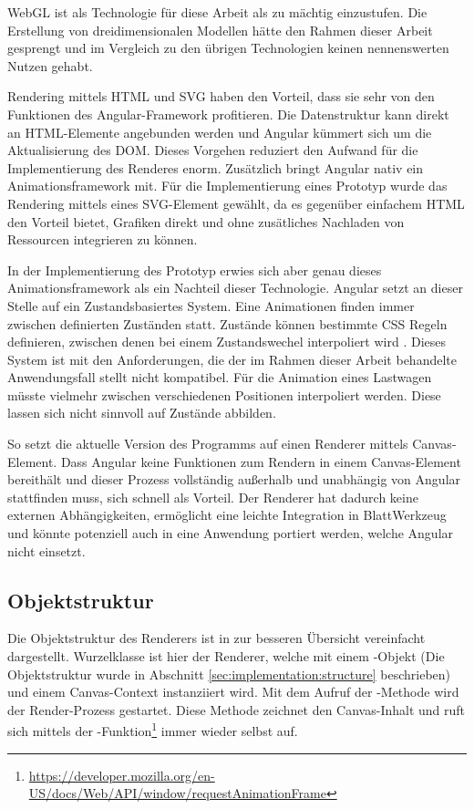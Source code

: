 WebGL ist als Technologie für diese Arbeit als zu mächtig einzustufen. Die Erstellung von dreidimensionalen Modellen hätte den Rahmen dieser Arbeit gesprengt und im Vergleich zu den übrigen Technologien keinen nennenswerten Nutzen gehabt.

Rendering mittels HTML und SVG haben den Vorteil, dass sie sehr von den Funktionen des Angular-Framework profitieren. Die Datenstruktur kann direkt an HTML-Elemente angebunden werden und Angular kümmert sich um die Aktualisierung des DOM. Dieses Vorgehen reduziert den Aufwand für die Implementierung des Renderes enorm. Zusätzlich bringt Angular nativ ein Animationsframework mit. Für die Implementierung eines Prototyp wurde das Rendering mittels eines SVG-Element gewählt, da es gegenüber einfachem HTML den Vorteil bietet, Grafiken direkt und ohne zusätliches Nachladen von Ressourcen integrieren zu können.

In der Implementierung des Prototyp erwies sich aber genau dieses Animationsframework als ein Nachteil dieser Technologie. Angular setzt an dieser Stelle auf ein Zustandsbasiertes System. Eine Animationen finden immer zwischen definierten Zuständen statt. Zustände können bestimmte CSS Regeln definieren, zwischen denen bei einem Zustandswechel interpoliert wird \cite{angular-animations}. Dieses System ist mit den Anforderungen, die der im Rahmen dieser Arbeit behandelte Anwendungsfall stellt nicht kompatibel. Für die Animation eines Lastwagen müsste vielmehr zwischen verschiedenen Positionen interpoliert werden. Diese lassen sich nicht sinnvoll auf Zustände abbilden.

So setzt die aktuelle Version des Programms auf einen Renderer mittels Canvas-Element. Dass Angular keine Funktionen zum Rendern in einem Canvas-Element bereithält und dieser Prozess vollständig außerhalb und unabhängig von Angular stattfinden muss,  sich schnell als Vorteil. Der Renderer hat dadurch keine externen Abhängigkeiten, ermöglicht eine leichte Integration in BlattWerkzeug und könnte potenziell auch in eine Anwendung portiert werden, welche Angular nicht einsetzt.

\subsection{Objektstruktur}

Die Objektstruktur des Renderers ist in  zur besseren Übersicht vereinfacht dargestellt. Wurzelklasse ist hier der Renderer, welche mit einem -Objekt (Die Objektstruktur wurde in Abschnitt \ref{sec:implementation:structure} beschrieben) und einem Canvas-Context instanziiert wird. Mit dem Aufruf der -Methode wird der Render-Prozess gestartet. Diese Methode zeichnet den Canvas-Inhalt und ruft sich mittels der -Funktion\footnote{\url{https://developer.mozilla.org/en-US/docs/Web/API/window/requestAnimationFrame}} immer wieder selbst auf.


